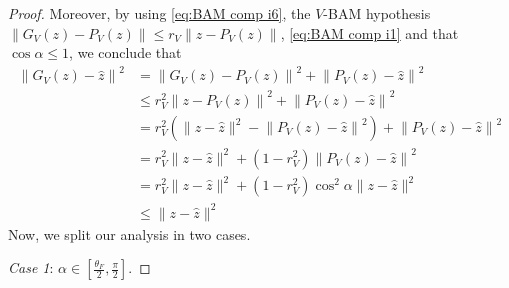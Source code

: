 \documentclass[smallextended,numbook,nospthms]{svjour3}
\theoremstyle{plain}
\theoremstyle{definition}
\begin{document}
\begin{proof}
	Moreover, by using \cref{eq:BAM comp i6}, the $V$-BAM hypothesis $\left\|G_{V}(z)-P_{V}(z)\right\| \leq r_{V}\left\|z-P_{V}(z)\right\|$, \cref{eq:BAM comp i1} and that $\cos \alpha \leq 1$, we conclude that
	\begin{align}
		\left\|G_{V}(z)-\hat{z}\right\|^{2} &=\left\|G_{V}(z)-P_{V}(z)\right\|^{2}+\left\|P_{V}(z)-\hat{z}\right\|^{2} \\
		& \leq r_{V}^{2}\left\|z-P_{V}(z)\right\|^{2}+\left\|P_{V}(z)-\hat{z}\right\|^{2} \\
		&=r_{V}^{2}\left(\|z-\hat{z}\|^{2}-\left\|P_{V}(z)-\hat{z}\right\|^{2}\right)+\left\|P_{V}(z)-\hat{z}\right\|^{2} \\
		&=r_{V}^{2}\|z-\hat{z}\|^{2}+\left(1-r_{V}^{2}\right)\left\|P_{V}(z)-\hat{z}\right\|^{2} \\
		&=r_{V}^{2}\|z-\hat{z}\|^{2}+\left(1-r_{V}^{2}\right) \cos ^{2} \alpha\|z-\hat{z}\|^{2} \label{eq:BAM comp ii5} \\
		& \leq\|z-\hat{z}\|^{2} \label{eq:BAM comp ii6}
	\end{align}
	Now, we split our analysis in two cases.
	
	\emph{Case 1}: $\alpha \in \left[\frac{\theta_{F}}{2}, \frac{\pi}{2}\right]$.
	

\end{proof}
\end{document}
